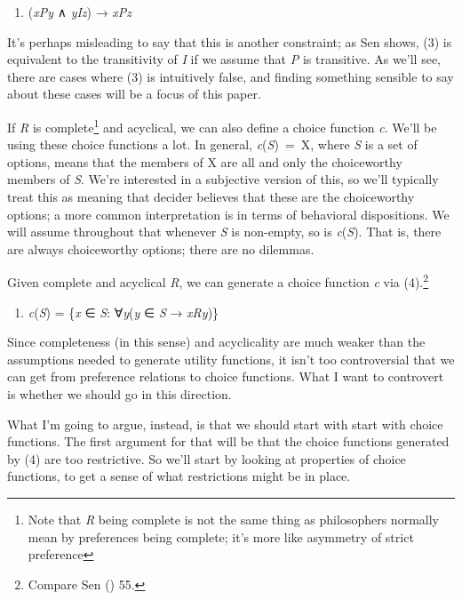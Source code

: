 \documentclass[
  12pt,
  letterpaper,
  DIV=11,
  numbers=noendperiod]{scrartcl}
\providecommand{\tightlist}{%
  \setlength{\itemsep}{0pt}\setlength{\parskip}{0pt}}
\begin{document}
\begin{enumerate}
\def\labelenumi{(\arabic{enumi})}
\setcounter{enumi}{2}
\tightlist
\item
  (\emph{xPy} ∧ \emph{yIz}) → \emph{xPz}
\end{enumerate}

It's perhaps misleading to say that this is another constraint; as Sen
shows, (3) is equivalent to the transitivity of \emph{I} if we assume
that \emph{P} is transitive. As we'll see, there are cases where (3) is
intuitively false, and finding something sensible to say about these
cases will be a focus of this paper.

If \emph{R} is complete\footnote{Note that \emph{R} being complete is
  not the same thing as philosophers normally mean by preferences being
  complete; it's more like asymmetry of strict preference} and
acyclical, we can also define a choice function \emph{c}. We'll be using
these choice functions a lot. In general, \emph{c}(\emph{S})~=~X, where
\emph{S} is a set of options, means that the members of X are all and
only the choiceworthy members of \emph{S}. We're interested in a
subjective version of this, so we'll typically treat this as meaning
that decider believes that these are the choiceworthy options; a more
common interpretation is in terms of behavioral dispositions. We will
assume throughout that whenever \emph{S} is non-empty, so is
\emph{c}(\emph{S}). That is, there are always choiceworthy options;
there are no dilemmas.

Given complete and acyclical \emph{R}, we can generate a choice function
\emph{c} via (4).\footnote{Compare Sen
  () 55.}

\begin{enumerate}
\def\labelenumi{(\arabic{enumi})}
\setcounter{enumi}{3}
\tightlist
\item
  \emph{c}(\emph{S}) = \{\emph{x} ∈ \emph{S}: ∀\emph{y}(\emph{y} ∈
  \emph{S} → \emph{xRy})\}
\end{enumerate}

Since completeness (in this sense) and acyclicality are much weaker than
the assumptions needed to generate utility functions, it isn't too
controversial that we can get from preference relations to choice
functions. What I want to controvert is whether we should go in this
direction.

What I'm going to argue, instead, is that we should start with start
with choice functions. The first argument for that will be that the
choice functions generated by (4) are too restrictive. So we'll start by
looking at properties of choice functions, to get a sense of what
restrictions might be in place.
\end{document}
